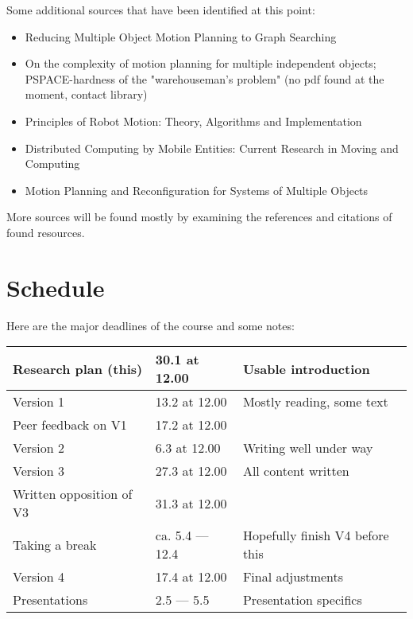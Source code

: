\documentclass[12pt,a4paper,english,oneside]{article}
\begin{document}
Some additional sources that have been identified at this point:

\begin{itemize}
	\item Reducing Multiple Object Motion Planning to Graph Searching \cite{hopcroft_reducing_1986} 
	\item On the complexity of motion planning for multiple independent objects; PSPACE-hardness of the "warehouseman's problem" (no pdf found at the moment, contact library)
	\item Principles of Robot Motion: Theory, Algorithms and Implementation \cite{choset_principles_2005}
	\item Distributed Computing by Mobile Entities: Current Research in Moving and Computing \cite{flocchini_distributed_2019}
	\item Motion Planning and Reconfiguration for Systems of Multiple Objects \cite{kolski_motion_2007}
\end{itemize}

More sources will be found mostly by examining the references and citations of found resources. 

\section{Schedule}

Here are the major deadlines of the course and some notes:

\begin{tabular}{|p{50mm}|p{30mm}|p{65mm}|}
	\hline
	Research plan (this)   & 30.1 at 12.00 & Usable introduction
	\\ \hline
	Version 1   & 13.2 at 12.00 & Mostly reading, some text
	\\ \hline
	Peer feedback on V1 & 17.2 at 12.00 & 
	\\ \hline
	Version 2   & 6.3 at 12.00 & Writing well under way
	\\ \hline
	Version 3   & 27.3 at 12.00 & All content written
	\\ \hline
	Written opposition of V3 & 31.3 at 12.00 & 
	\\ \hline
	Taking a break   & ca. 5.4 --- 12.4 & Hopefully finish V4 before this
	\\ \hline
	Version 4   & 17.4 at 12.00 & Final adjustments
	\\ \hline
	Presentations  	& 2.5 --- 5.5 & Presentation specifics
	\\ \hline
\end{tabular}
\end{document}
